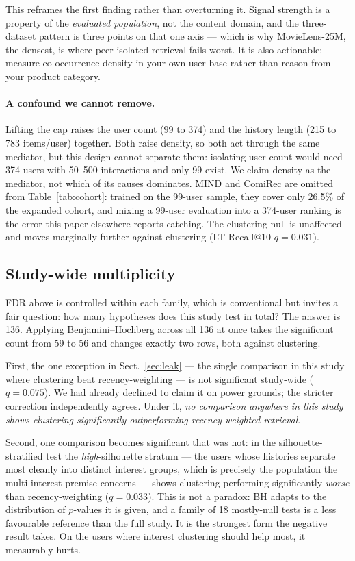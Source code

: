 \documentclass[runningheads]{llncs}
\begin{document}
This reframes the first finding rather than overturning it. Signal strength is a property
of the \emph{evaluated population}, not the content domain, and the three-dataset pattern
is three points on that one axis --- which is why MovieLens-25M, the densest, is where
peer-isolated retrieval fails worst. It is also actionable: measure co-occurrence density
in your own user base rather than reason from your product category.

\paragraph{A confound we cannot remove.} Lifting the cap raises the user count (99 to 374)
and the history length (215 to 783 items/user) together. Both raise density, so both act
through the same mediator, but this design cannot separate them: isolating user count would
need 374 users with 50--500 interactions and only 99 exist. We claim density as the
mediator, not which of its causes dominates. MIND and ComiRec are omitted from
Table~\ref{tab:cohort}: trained on the 99-user sample, they cover only 26.5\% of the
expanded cohort, and mixing a 99-user evaluation into a 374-user ranking is the error this
paper elsewhere reports catching. The clustering null is unaffected and moves marginally
further against clustering (LT-Recall@10 $q = 0.031$).

\subsection{Study-wide multiplicity}\label{sec:multi}

FDR above is controlled within each family, which is conventional but invites a fair
question: how many hypotheses does this study test in total? The answer is 136. Applying
Benjamini--Hochberg across all 136 at once takes the significant count from 59 to 56 and
changes exactly two rows, both against clustering.

First, the one exception in Sect.~\ref{sec:leak} --- the single comparison in this study where
clustering beat recency-weighting --- is not significant study-wide ($q = 0.075$). We had
already declined to claim it on power grounds; the stricter correction independently agrees.
Under it, \emph{no comparison anywhere in this study shows clustering significantly
outperforming recency-weighted retrieval}.

Second, one comparison becomes significant that was not: in the silhouette-stratified test the
\emph{high}-silhouette stratum --- the users whose histories separate most cleanly into
distinct interest groups, which is precisely the population the multi-interest premise
concerns --- shows clustering performing significantly \emph{worse} than recency-weighting
($q = 0.033$). This is not a paradox: BH adapts to the distribution of $p$-values it is given, and a
family of 18 mostly-null tests is a less favourable reference than the full study. It is the strongest form the negative result takes. On the
users where interest clustering should help most, it measurably hurts.
\end{document}
